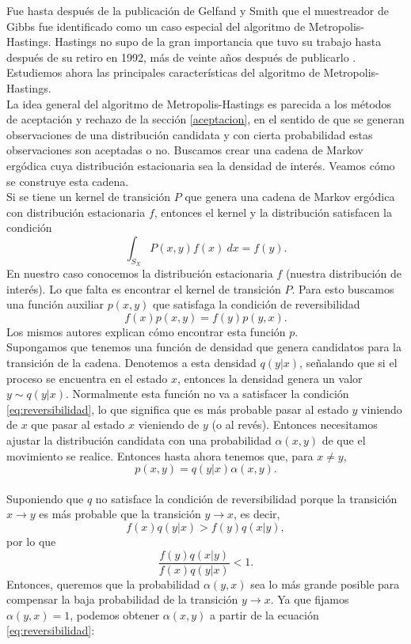 \documentclass[11pt,a4paper]{article}
\begin{document}
Fue hasta después de la publicación de Gelfand y Smith que el muestreador de Gibbs fue identificado como un caso especial del algoritmo de Metropolis-Hastings. Hastings no supo de la gran importancia que tuvo su trabajo hasta después de su retiro en 1992, más de veinte años después de publicarlo \citep{bertsch}. Estudiemos ahora las principales características del algoritmo de Metropolis-Hastings.\\

La idea general del algoritmo de Metropolis-Hastings es parecida a los métodos de aceptación y rechazo de la sección \ref{aceptacion}, en el sentido de que se generan observaciones de una distribución candidata y con cierta probabilidad estas observaciones son aceptadas o no. Buscamos crear una cadena de Markov ergódica cuya distribución estacionaria sea la densidad de interés. Veamos cómo se construye esta cadena.\\

Si se tiene un kernel de transición $P$ que genera una cadena de Markov ergódica con distribución estacionaria $f$, entonces el kernel y la distribución satisfacen la condición \citep{chib_mh}
$$\int_{S_X} P(x, y)f(x) \ dx = f(y).$$ En nuestro caso conocemos la distribución estacionaria $f$ (nuestra distribución de interés). Lo que falta es encontrar el kernel de transición $P$. Para esto buscamos una función auxiliar $p(x, y)$ que satisfaga la condición de reversibilidad \citep{chib_mh}
\begin{equation} \label{eq:reversibilidad}
f(x)p(x, y) = f(y)p(y, x).
\end{equation}
Los mismos autores explican cómo encontrar esta función $p$.\\

Supongamos que tenemos una función de densidad que genera candidatos para la transición de la cadena. Denotemos a esta densidad $q(y|x)$, señalando que si el proceso se encuentra en el estado $x$, entonces la densidad genera un valor $y \sim q(y|x)$. Normalmente esta función no va a satisfacer la condición \eqref{eq:reversibilidad}, lo que significa que es más probable pasar al estado $y$ viniendo de $x$ que pasar al estado $x$ vieniendo de $y$ (o al revés). Entonces necesitamos ajustar la distribución candidata con una probabilidad $\alpha (x, y)$ de que el movimiento se realice. Entonces hasta ahora tenemos que, para $x \neq y$, $$p(x, y) = q(y | x) \alpha (x, y).$$\\

Suponiendo que $q$ no satisface la condición de reversibilidad porque la transición $x \to y$ es más probable que la transición $y \to x$, es decir, $$f(x)q(y|x) > f(y)q(x|y),$$ por lo que $$\frac{f(y)q(x|y)}{f(x)q(y|x)} < 1.$$ Entonces, queremos que la probabilidad $\alpha(y, x)$ sea lo más grande posible para compensar la baja probabilidad de la transición $y \to x$. Ya que fijamos $\alpha(y, x) = 1$, podemos obtener $\alpha(x, y)$ a partir de la ecuación \eqref{eq:reversibilidad}:\\
\end{document}
